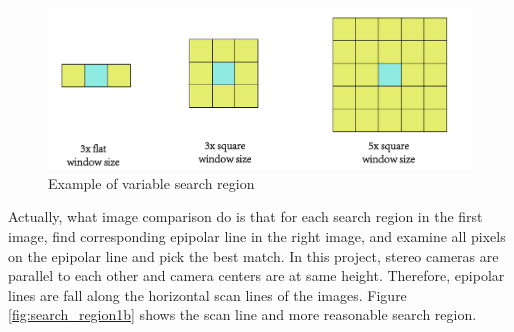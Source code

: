 \begin{figure}[h!]
	\centering
	\includegraphics[width=0.8\linewidth]{figures/part2/search_region}
	\caption{Example of variable search region}
	\label{fig:search_region}
\end{figure}

Actually, what  image comparison do is that for each search region in the first image, find corresponding epipolar line in the right image, and examine all pixels on the epipolar line and pick the best match. In this project, stereo cameras are parallel to each other and camera centers are at same height. Therefore, epipolar lines are fall along the horizontal scan lines of the images. Figure \ref{fig:search_region1b} shows the scan line and more reasonable search region.

